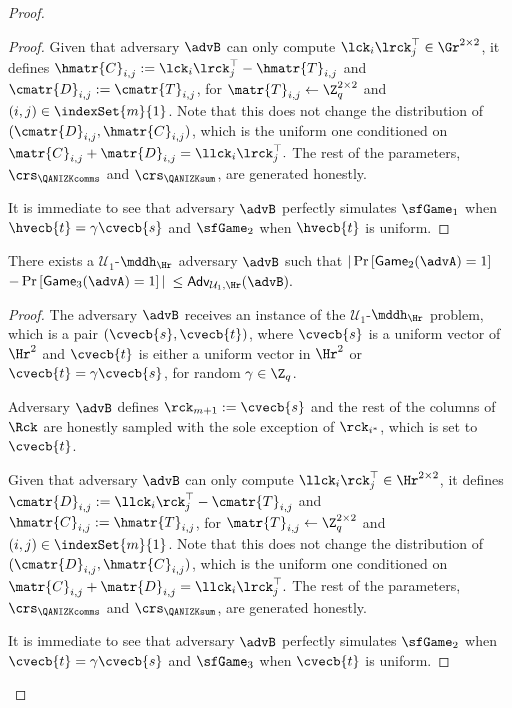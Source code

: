 \begin{proof}
\begin{enumerate}[label=(\roman*)]
\begin{proof}
Given that adversary $\advB$ can only compute $\lck_{i}\lrck_j^\top\in\Gr^{2\times2}$,
it defines $\hmatr{C}_{i,j} := \lck_{i}\lrck_j^\top - \hmatr{T}_{i,j}$ and
$\cmatr{D}_{i,j}:=\cmatr{T}_{i,j}$, for $\matr{T}_{i,j}\gets\Z_q^{2\times 2}$ and $(i,j)\in\indexSet{m}{1}$. Note 
that this does not change the distribution of $(\cmatr{D}_{i,j},\hmatr{C}_{i,j})$, which is the uniform one conditioned
on $\matr{C}_{i,j}+\matr{D}_{i,j}= \llck_i\lrck_j^\top.$ The rest of the parameters, $\crs_\QANIZKcomms$ and $\crs_\QANIZKsum$, are generated honestly.

It is immediate to see that adversary $\advB$ perfectly simulates $\sfGame_1$ when $\hvecb{t}=\gamma\cvecb{s}$ and $\sfGame_2$ when $\hvecb{t}$ is uniform.  
\end{proof}

\begin{lemma} There exists a $\mathcal{U}_1$-$\mddh_\Hr$ adversary $\advB$ such that
$|\Pr\left[\mathsf{Game}_{2}(\advA)=1\right]$ $-\Pr\left[\mathsf{Game}_{3}(\advA)=1\right]|$ $\leq
\mathsf{Adv}_{\mathcal{U}_1,\Hr}(\advB).$
\label{lemma:bits3}
\end{lemma}

\begin{proof}
The adversary $\advB$ receives an instance of the $\mathcal{U}_1$-$\mddh_\Hr$ problem, which is a pair
$(\cvecb{s}, \cvecb{t})$, where $\cvecb{s}$ is a uniform vector 
of $\Hr^{2}$ and $\cvecb{t}$ is either a uniform vector in $\Hr^2$ or 
$\cvecb{t}=\gamma\cvecb{s}$, for random $\gamma\in\Z_q$.      
 
Adversary $\advB$ defines 
$\rck_{m+1}:= \cvecb{s}$ and the rest of the columns of $\Rck$ are honestly sampled
with the sole exception of $\rck_{i^*}$, which is set to $\cvecb{t}$.

Given that adversary $\advB$ can only compute $\llck_{i}\rck_j^\top\in\Hr^{2\times2}$,
it defines $\cmatr{D}_{i,j} := \llck_{i}\rck_j^\top - \cmatr{T}_{i,j}$ and
$\hmatr{C}_{i,j}:=\hmatr{T}_{i,j}$, for $\matr{T}_{i,j}\gets\Z_q^{2\times 2}$ and $(i,j)\in\indexSet{m}{1}$. Note 
that this does not change the distribution of $(\cmatr{D}_{i,j},\hmatr{C}_{i,j})$, which is the uniform one conditioned
on $\matr{C}_{i,j}+\matr{D}_{i,j}= \llck_i\lrck_j^\top.$ The rest of the parameters, $\crs_\QANIZKcomms$ and $\crs_\QANIZKsum$,
are generated honestly.

It is immediate to see that adversary $\advB$ perfectly simulates $\sfGame_2$ when $\cvecb{t}=\gamma\cvecb{s}$ and $\sfGame_3$ when $\cvecb{t}$ is uniform.  
\end{proof}


\end{enumerate}
\end{proof}
